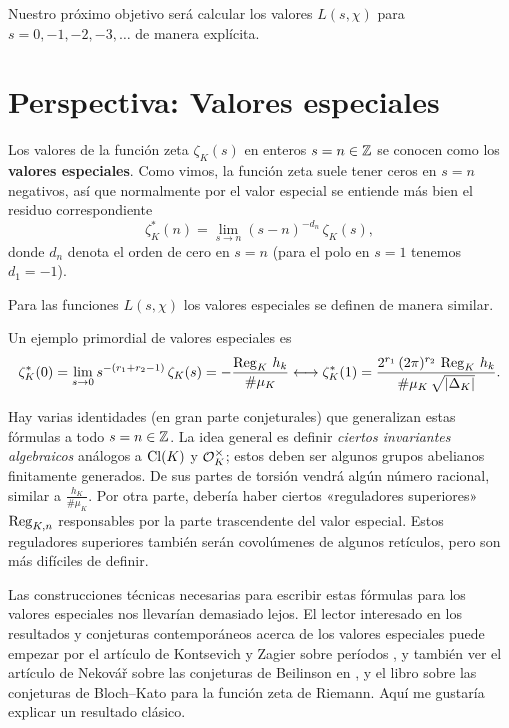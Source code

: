 Nuestro próximo objetivo será calcular los valores $L (s,\chi)$ para
$s = 0,-1,-2,-3,\ldots$ de manera explícita.


\section{Perspectiva: Valores especiales}

Los valores de la función zeta $\zeta_K (s)$ en enteros $s = n \in \mathbb{Z}$ se
conocen como los \textbf{valores especiales}. Como vimos, la función zeta suele
tener ceros en $s = n$ negativos, así que normalmente por el valor especial se
entiende más bien el residuo correspondiente
$$\zeta_K^* (n) = \lim_{s \to n} (s-n)^{-d_n}\,\zeta_K (s),$$
donde $d_n$ denota el orden de cero en $s = n$ (para el polo en $s = 1$ tenemos
$d_1 = -1$).

Para las funciones $L (s,\chi)$ los valores especiales se definen de manera
similar.

Un ejemplo primordial de valores especiales es
\[ \zeta_K^* (0) = \lim_{s \to 0} s^{-(r_1 + r_2 - 1)}\,\zeta_K (s) = -\frac{\operatorname{Reg}_K\,h_k}{\# \mu_K}
   \longleftrightarrow
   \zeta_K^* (1) = \frac{2^{r_1}\,(2\pi)^{r_2}\,\operatorname{Reg}_K\,h_k}{\#\mu_K\,\sqrt{|\Delta_K|}}. \]

Hay varias identidades (en gran parte conjeturales) que generalizan estas
fórmulas a todo $s = n \in \mathbb{Z}$. La idea general es definir
\emph{ciertos invariantes algebraicos} análogos a $\operatorname{Cl} (K)$ y $\mathcal{O}_K^\times$;
estos deben ser algunos grupos abelianos finitamente generados. De sus partes de
torsión vendrá algún número racional, similar a $\frac{h_K}{\# \mu_K}$.
Por otra parte, debería haber ciertos «reguladores superiores» $\operatorname{Reg}_{K,n}$
responsables por la parte trascendente del valor especial. Estos reguladores
superiores también serán covolúmenes de algunos retículos, pero son más
difíciles de definir.

Las construcciones técnicas necesarias para escribir estas fórmulas para los
valores especiales nos llevarían demasiado lejos. El lector interesado en los
resultados y conjeturas contemporáneos acerca de los valores especiales puede
empezar por el artículo de Kontsevich y Zagier sobre períodos
\cite{Kontsevich-Zagier}, y también ver el artículo de Nekov\'a\v{r} sobre las
conjeturas de Beilinson en \cite{Motives-I}, y el libro
\cite{Bloch-Kato-for-riemann-zeta} sobre las conjeturas de Bloch--Kato para la
función zeta de Riemann. Aquí me gustaría explicar un resultado clásico.

